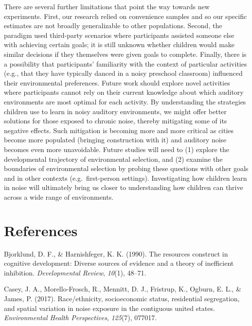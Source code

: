 \documentclass[10pt, letterpaper]{article}
\begin{document}
There are several further limitations that point the way towards new
experiments. First, our research relied on convenience samples and so
our specific estimates are not broadly generalizable to other
populations. Second, the paradigm used third-party scenarios where
participants assisted someone else with achieving certain goals; it is
still unknown whether children would make similar decisions if they
themselves were given goals to complete. Finally, there is a possibility
that participants' familiarity with the context of particular activities
(e.g., that they have typically danced in a noisy preschool classroom)
influenced their environmental preferences. Future work should explore
novel activities where participants cannot rely on their current
knowledge about which auditory environments are most optimal for each
activity. By understanding the strategies children use to learn in noisy
auditory environments, we might offer better solutions for those exposed
to chronic noise, thereby mitigating some of its negative effects. Such
mitigation is becoming more and more critical as cities become more
populated (bringing construction with it) and auditory noise becomes
even more unavoidable. Future studies will need to (1) explore the
developmental trajectory of environmental selection, and (2) examine the
boundaries of environmental selection by probing these questions with
other goals and in other contexts (e.g.~first-person settings).
Investigating how children learn in noise will ultimately bring us
closer to understanding how children can thrive across a wide range of
environments.

\hypertarget{references}{%
\section{References}\label{references}}

\setlength{\parindent}{-0.1in} 
\setlength{\leftskip}{0.125in}

\noindent

\hypertarget{refs}{}
\leavevmode\hypertarget{ref-bjorklund1990}{}%
Bjorklund, D. F., \& Harnishfeger, K. K. (1990). The resources construct
in cognitive development: Diverse sources of evidence and a theory of
inefficient inhibition. \emph{Developmental Review}, \emph{10}(1),
48--71.

\leavevmode\hypertarget{ref-casey2017}{}%
Casey, J. A., Morello-Frosch, R., Mennitt, D. J., Fristrup, K., Ogburn,
E. L., \& James, P. (2017). Race/ethnicity, socioeconomic status,
residential segregation, and spatial variation in noise exposure in the
contiguous united states. \emph{Environmental Health Perspectives},
\emph{125}(7), 077017.
\end{document}
